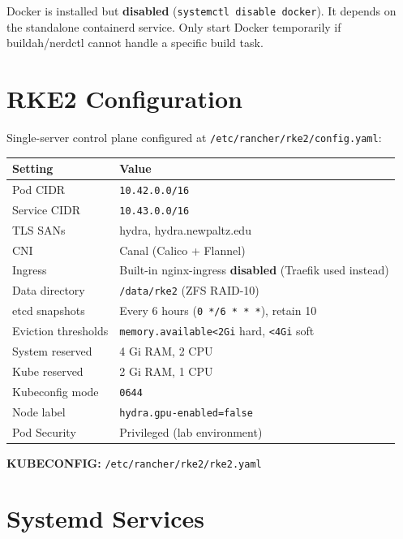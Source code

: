\documentclass[11pt,a4paper]{article}
\begin{document}
\begin{warningbox}
Docker is installed but \textbf{disabled} (\texttt{systemctl disable docker}). It depends on the standalone containerd service. Only start Docker temporarily if buildah/nerdctl cannot handle a specific build task.
\end{warningbox}

\section{RKE2 Configuration}

Single-server control plane configured at \texttt{/etc/rancher/rke2/config.yaml}:

\begin{table}[H]
\centering
\begin{tabular}{lp{8cm}}
\toprule
\textbf{Setting} & \textbf{Value} \\
\midrule
Pod CIDR & \texttt{10.42.0.0/16} \\
Service CIDR & \texttt{10.43.0.0/16} \\
TLS SANs & hydra, hydra.newpaltz.edu \\
CNI & Canal (Calico + Flannel) \\
Ingress & Built-in nginx-ingress \textbf{disabled} (Traefik used instead) \\
Data directory & \texttt{/data/rke2} (ZFS RAID-10) \\
etcd snapshots & Every 6 hours (\texttt{0 */6 * * *}), retain 10 \\
Eviction thresholds & \texttt{memory.available<2Gi} hard, \texttt{<4Gi} soft \\
System reserved & 4 Gi RAM, 2 CPU \\
Kube reserved & 2 Gi RAM, 1 CPU \\
Kubeconfig mode & \texttt{0644} \\
Node label & \texttt{hydra.gpu-enabled=false} \\
Pod Security & Privileged (lab environment) \\
\bottomrule
\end{tabular}
\end{table}

\textbf{KUBECONFIG:} \texttt{/etc/rancher/rke2/rke2.yaml}

\section{Systemd Services}
\end{document}
